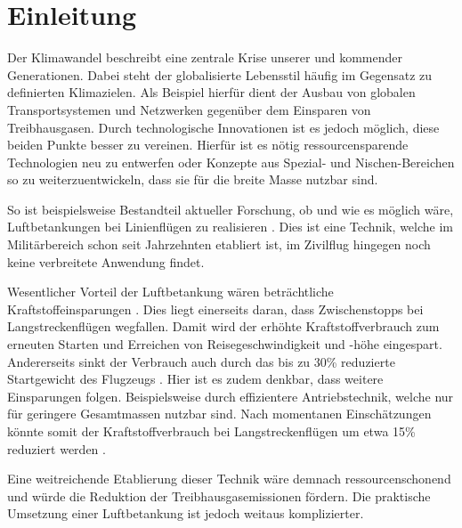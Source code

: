 \chapter{Einleitung}\label{chap:Einführung}

Der Klimawandel beschreibt eine zentrale Krise unserer und kommender Generationen. Dabei steht der globalisierte Lebensstil häufig im Gegensatz zu definierten Klimazielen. Als Beispiel hierfür dient der Ausbau von globalen Transportsystemen und Netzwerken gegenüber dem Einsparen von Treibhausgasen. Durch technologische Innovationen ist es jedoch möglich, diese beiden Punkte besser zu vereinen. Hierfür ist es nötig ressourcensparende Technologien neu zu entwerfen oder Konzepte aus Spezial- und Nischen-Bereichen so zu weiterzuentwickeln, dass sie für die breite Masse nutzbar sind. 

So ist beispielsweise Bestandteil aktueller Forschung, ob und wie es möglich wäre, Luftbetankungen bei Linienflügen zu realisieren \cite{RECREATE, RefuelingTime, CEAS2015}. Dies ist eine Technik, welche im Militärbereich schon seit Jahrzehnten etabliert ist, im Zivilflug hingegen noch keine verbreitete Anwendung findet.

Wesentlicher Vorteil der Luftbetankung wären beträchtliche Kraftstoffeinsparungen \cite{RefuelingTime}.
Dies liegt einerseits daran, dass Zwischenstopps bei Langstreckenflügen wegfallen. Damit wird der erhöhte Kraftstoffverbrauch zum erneuten Starten und Erreichen von Reisegeschwindigkeit und -höhe eingespart.  
Andererseits sinkt der Verbrauch auch durch das bis zu 30\% reduzierte Startgewicht des Flugzeugs \cite{CEAS2015}. Hier ist es zudem denkbar, dass weitere Einsparungen folgen. Beispielsweise durch effizientere Antriebstechnik, welche nur für geringere Gesamtmassen nutzbar sind. 
Nach momentanen Einschätzungen könnte somit der Kraftstoffverbrauch bei Langstreckenflügen um etwa 15\% reduziert werden \cite{RefuelingTime}.

Eine weitreichende Etablierung dieser Technik wäre demnach ressourcenschonend und würde die Reduktion der Treibhausgasemissionen fördern. Die praktische Umsetzung einer Luftbetankung ist jedoch weitaus komplizierter.
 
